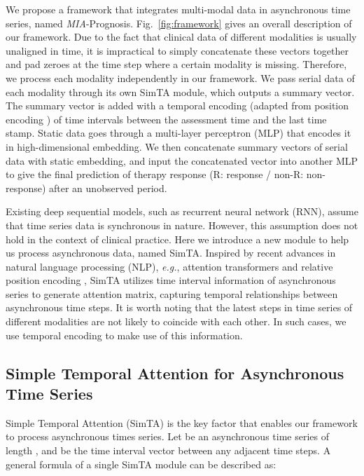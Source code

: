 \documentclass[runningheads]{llncs}
\newcommand{\eg}{\textit{e.g.}}
\newcommand{\miap}{\emph{MIA}-Prognosis}
\begin{document}
	We propose a framework that integrates multi-modal data in asynchronous time series, named \miap. Fig.~\ref{fig:framework} gives an overall description of our framework. Due to the fact that clinical data of different modalities is usually unaligned in time, it is impractical to simply concatenate these vectors together and pad zeroes at the time step where a certain modality is missing. Therefore, we process each modality independently in our framework. We pass serial data of each modality through its own SimTA module, which outputs a summary vector. The summary vector is added with a temporal encoding (adapted from position encoding \cite{Vaswani2017AttentionIA}) of time intervals between the assessment time and the last time stamp. Static data goes through a multi-layer perceptron (MLP) that encodes it in high-dimensional embedding. We then concatenate summary vectors of serial data with static embedding, and input the concatenated vector into another MLP to give the final prediction of therapy response (R: response / non-R: non-response) after an unobserved period. 
	
	Existing deep sequential models, such as recurrent neural network (RNN), assume that time series data is synchronous in nature. However, this assumption does not hold in the context of clinical practice. Here we introduce a new module to help us process asynchronous data, named SimTA. Inspired by recent advances in natural language processing (NLP), \eg, attention transformers \cite{Vaswani2017AttentionIA,Devlin2019BERTPO} and relative position encoding \cite{Shaw2018SelfAttentionWR}, SimTA utilizes time interval information of asynchronous series to generate attention matrix, capturing temporal relationships between asynchronous time steps. It is worth noting that the latest steps in time series of different modalities are not likely to coincide with each other. In such cases, we use temporal encoding to make use of this information.

\subsection{Simple Temporal Attention for Asynchronous Time Series} \label{sec:simta}

	Simple Temporal Attention (SimTA) is the key factor that enables our framework to process asynchronous times series. Let  be an asynchronous time series of length , and  be the time interval vector between any adjacent time steps. A general formula of a single SimTA module can be described as:
	
\end{document}
